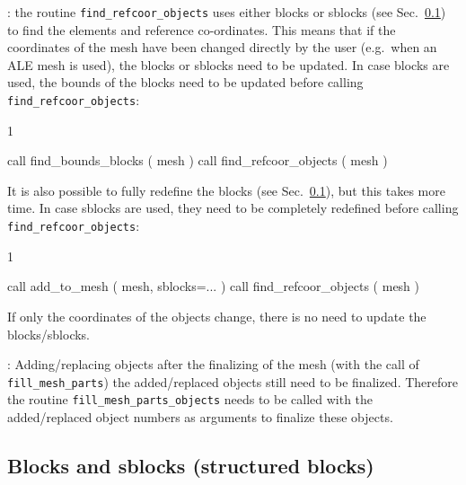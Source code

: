 : the routine \texttt{find\_refcoor\_objects} uses either
blocks or sblocks (see Sec.~\ref{sec:blocks}) to find the elements and
reference co-ordinates.
This means that if the coordinates of the mesh have been
changed directly by the user (e.g.\ when an ALE mesh is used),
the blocks or sblocks need to be updated. In case blocks are used,
the bounds of the blocks need to be updated before calling
\texttt{find\_refcoor\_objects}:
\begin{listing}{1}

  call find_bounds_blocks ( mesh )
  call find_refcoor_objects ( mesh )

\end{listing}
It is also possible to fully redefine the blocks (see Sec.~\ref{sec:blocks}),
but this takes more time.
In case sblocks are used, they need to be completely redefined
before calling
\texttt{find\_refcoor\_objects}:
\begin{listing}{1}

  call add_to_mesh ( mesh, sblocks=... )
  call find_refcoor_objects ( mesh )

\end{listing}
If only the coordinates of the objects change,
there is no need to update the blocks/sblocks.

: Adding/replacing objects after the finalizing of the mesh
(with the call of \texttt{fill\_mesh\_parts}) the added/replaced objects still
need to be finalized. Therefore the routine \texttt{fill\_mesh\_parts\_objects} 
needs to be called with the added/replaced object numbers as arguments to
finalize these objects.

\subsection{Blocks and sblocks (structured blocks)}
\label{sec:blocks}

